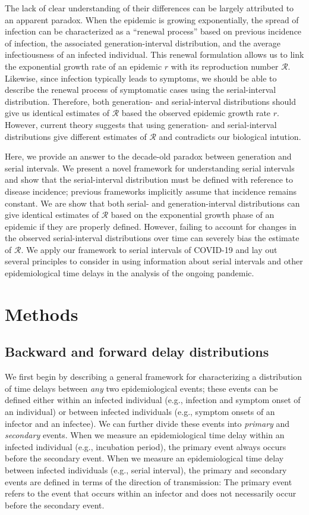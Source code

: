 \documentclass[12pt]{article}
\begin{document}
The lack of clear understanding of their differences can be largely attributed to an apparent paradox.
When the epidemic is growing exponentially, the spread of infection can be characterized as a ``renewal process'' based on previous incidence of infection, the associated generation-interval distribution, and the average infectiousness of an infected individual.
This renewal formulation allows us to link the exponential growth rate of an epidemic $r$ with its reproduction number $\mathcal R$.
Likewise, since infection typically leads to symptoms, we should be able to describe the renewal process of symptomatic cases using the serial-interval distribution.
Therefore, both generation- and serial-interval distributions should give us identical estimates of  $\mathcal R$ based the observed epidemic growth rate $r$.
However, current theory suggests that using generation- and serial-interval distributions give different estimates of $\mathcal R$ and contradicts our biological intution.

Here, we provide an answer to the decade-old paradox between generation and serial intervals.
We present a novel framework for understanding serial intervals and show that the serial-interval distribution must be defined with reference to disease incidence;
previous frameworks implicitly assume that incidence remains constant.
We are show that both serial- and generation-interval distributions can give identical estimates of $\mathcal R$ based on the exponential growth phase of an epidemic if they are properly defined.
However, failing to account for changes in the observed serial-interval distributions over time can severely bias the estimate of $\mathcal R$.
We apply our framework to serial intervals of COVID-19 and lay out several principles to consider in using information about serial intervals and other epidemiological time delays in the analysis of the ongoing pandemic.

\section{Methods}

\subsection{Backward and forward delay distributions}

We first begin by describing a general framework for characterizing a distribution of time delays between \emph{any} two epidemiological events;
these events can be defined either within an infected individual (e.g., infection and symptom onset of an individual) or between infected individuals (e.g., symptom onsets of an infector and an infectee).
We can further divide these events into \emph{primary} and \emph{secondary} events.
When we measure an epidemiological time delay within an infected individual (e.g., incubation period), the primary event always occurs before the secondary event.
When we measure an epidemiological time delay between infected individuals (e.g., serial interval), 
the primary and secondary events are defined in terms of the direction of transmission:
The primary event refers to the event that occurs within an infector and does not necessarily occur before the secondary event.
\end{document}
